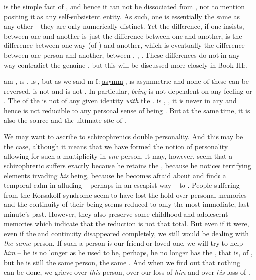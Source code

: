  is the simple fact of , and hence it can not be
dissociated from , not to mention positing it as any
self-subsistent entity. As such, one  is essentially the same as any
other -- they are only numerically distinct. Yet the difference, if one insists,
between one  and another is just the difference between one
 and another, is the difference between one way (of )
and another, which is eventually the difference between one person and another,
between , , . These differences do not in any way
contradict the genuine , but this will be discussed more closely
in Book III:.


\pa\label{asymSelf}  am ,  is ,
 is , but as we said in I:\ref{asymm},  is
asymmetric and none of these can be reversed.  is not  and
 is not . In particular, {\em being}  is not
dependent on any feeling or .  The  of the
 is not  of any given identity {\em with} the
.   is  ,  , it is
never  in any  and hence is not reducible to
any personal sense of being . But at the same time, it is also the
source and the ultimate site of  .

We may want to ascribe to schizophrenics double personality. And this may be the
case, although it means that we have formed the notion of personality allowing
for such a multiplicity in {\em one} person. It may, however, seem that a schizophrenic
suffers exactly because he retains the , because he notices
terrifying elements invading {\em his} being, because he becomes afraid about
 and finds a temporal calm in alluding -- perhaps in an escapist way
-- to .  People suffering from the Korsakoff syndrome seem to have
lost the hold over personal memories and the continuity of their being seems
reduced to only the most immediate, last minute's past. However, they also
preserve some childhood and adolescent memories which indicate that the
reduction is not that total. But even if it were, even if the  and continuity disappeared completely, we still would be dealing with
{\em the same} person. If such a person is our friend or loved one, we will try
to help {\em him} -- he is no longer  as he used to be, perhaps, he
no longer has the , that is, of , but he is still
the same person, the same .  And when we find out that nothing can
be done, we grieve over {\em this} person, over our loss of {\em him} and over
{\em his} loss of .


